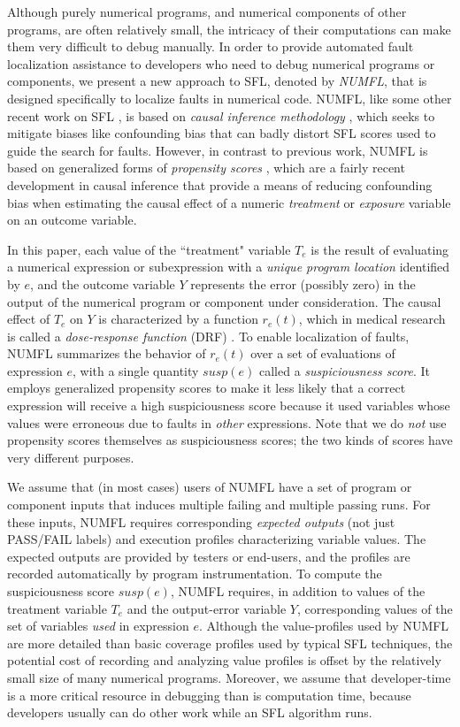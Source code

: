 \documentclass[times]{stvrauth}
\begin{document}
Although purely numerical programs, and numerical components of other programs, are often relatively small, the intricacy of their computations can make them very difficult to debug manually.  In order to provide automated fault localization assistance to developers who need to debug numerical programs or components, we present a new approach to SFL, denoted by {\it NUMFL}, that is designed specifically to localize faults in numerical code.  NUMFL, like some other recent work on SFL \cite{Baah2010,Baah2011, Gore2012,Shu2013}, is based on {\it causal inference methodology} \cite{Pearl2003}, which seeks to mitigate biases like confounding bias that can badly distort SFL scores used to guide the search for faults.  However, in contrast to previous work, NUMFL is based on generalized forms of {\it propensity scores} \cite{Imai2004,Imai2014}, which are a fairly recent development in causal inference that provide a means of reducing confounding bias when estimating the causal effect of a numeric {\it treatment} or {\it exposure} variable on an outcome variable.

In this paper, each value of the ``treatment" variable $T_e$ is the result of evaluating a numerical expression or subexpression with a {\it unique program location} identified by $e$,   and the outcome variable $Y$ represents the error (possibly zero) in the output of the numerical program or component under consideration.  The causal effect of $T_e$ on $Y$ is characterized by a function $r_e (t)$, which in medical research is called a {\it dose-response function} (DRF) \cite{Hirano2004}.  To enable localization of faults, NUMFL summarizes the behavior of $r_e (t)$ over a set of evaluations of expression $e$, with a single quantity $susp(e)$ called a {\it suspiciousness score}. It employs generalized propensity scores to make it less likely that a correct expression will receive a high suspiciousness score because it used variables whose values were erroneous due to faults in {\it other} expressions. Note that we do {\it not} use propensity scores themselves as suspiciousness scores; the two kinds of scores have very different purposes.

We assume that (in most cases) users of NUMFL have a set of program or component inputs that induces multiple failing and multiple passing runs.  For these inputs, NUMFL requires corresponding {\it expected outputs} (not just PASS/FAIL labels) and execution profiles characterizing variable values.  The expected outputs are provided by testers or end-users, and the profiles are recorded automatically by program instrumentation.  To compute the suspiciousness score $susp(e)$,  NUMFL requires, in addition to values of the treatment variable $T_e$ and the output-error variable $Y$, corresponding values of the set of variables {\it used} in expression $e$.  Although the value-profiles used by NUMFL are more detailed than basic coverage profiles used by typical SFL techniques, the potential cost of recording and analyzing value profiles is offset by the relatively small size of many numerical programs.   Moreover, we assume that developer-time is a more critical resource in debugging than is computation time, because developers usually can do other work while an SFL algorithm runs.
\end{document}
